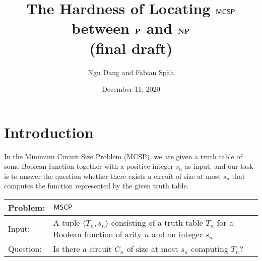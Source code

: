 \documentclass[11pt]{article}
\author{Ngu Dang and Fabian Späh}
\title{The Hardness of Locating $\mathprob{MCSP}$ between $\P$ and $\NP$ \\ \smallskip \normalsize{(final draft)}}
\date{December 11, 2020}
\begin{document}
	\maketitle
	
\section{Introduction}

In the Minimum Circuit Size Problem (MCSP), we are given a truth table of some Boolean function together with a positive integer $s_n$ as input, and our task is to answer the question whether there exists a circuit of size at most $s_n$ that computes the function represented by the given truth table.

{
	\renewcommand{\arraystretch}{1.5}
	\begin{center}
		\begin{tabular}{|p{2cm}p{11cm}|}
			\hline
			Problem:
			&
			$\mathprob{MSCP}$
			\\
			\hline
			Input:
			&
			A tuple $\langle T_n, s_n \rangle$ consisting of a truth table $T_n$ for
			a Boolean function of arity $n$ and an integer $s_n$
			\\
			Question: & Is there a circuit $C_n$ of size at most $s_n$ computing $T_n$?
			\\
			\hline
		\end{tabular}
	\end{center}
}
\end{document}
